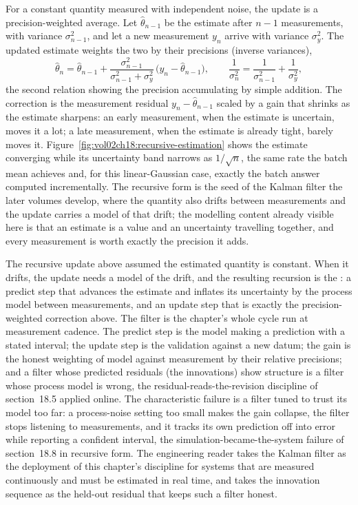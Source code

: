 For a constant quantity measured with independent noise, the update is a
precision-weighted average. Let $\hat\theta_{n-1}$ be the estimate after
$n-1$ measurements, with variance $\sigma_{n-1}^2$, and let a new
measurement $y_n$ arrive with variance $\sigma_y^2$. The updated estimate
weights the two by their precisions (inverse variances),
\[
\hat\theta_n = \hat\theta_{n-1} +
  \frac{\sigma_{n-1}^2}{\sigma_{n-1}^2 + \sigma_y^2}\,
  \bigl(y_n - \hat\theta_{n-1}\bigr),
\qquad
\frac{1}{\sigma_n^2} = \frac{1}{\sigma_{n-1}^2} + \frac{1}{\sigma_y^2},
\]
the second relation showing the precision accumulating by simple addition.
The correction is the measurement residual $y_n - \hat\theta_{n-1}$ scaled
by a gain that shrinks as the estimate sharpens: an early measurement, when
the estimate is uncertain, moves it a lot; a late measurement, when the
estimate is already tight, barely moves it.
Figure~\ref{fig:vol02ch18:recursive-estimation} shows the estimate
converging while its uncertainty band narrows as $1/\sqrt{n}$, the same rate
the batch mean achieves and, for this linear-Gaussian case, exactly the
batch answer computed incrementally. The recursive form is the seed of the
Kalman filter the later volumes develop, where the quantity also drifts
between measurements and the update carries a model of that drift; the
modelling content already visible here is that an estimate is a value and an
uncertainty travelling together, and every measurement is worth exactly the
precision it adds.



\begin{mastery}
The recursive update above assumed the estimated quantity is constant. When
it drifts, the update needs a model of the drift, and the resulting recursion
is the : a predict step that advances the estimate and
inflates its uncertainty by the process model between measurements, and an
update step that is exactly the precision-weighted correction above. The
filter is the chapter's whole cycle run at measurement cadence. The predict
step is the model making a prediction with a stated interval; the update step
is the validation against a new datum; the gain is the honest weighting of
model against measurement by their relative precisions; and a filter whose
predicted residuals (the innovations) show structure is a filter whose
process model is wrong, the residual-reads-the-revision discipline of
section~18.5 applied online. The characteristic failure is a filter tuned to
trust its model too far: a process-noise setting too small makes the gain
collapse, the filter stops listening to measurements, and it tracks its own
prediction off into error while reporting a confident interval, the
simulation-became-the-system failure of section~18.8 in recursive form. The
engineering reader takes the Kalman filter as the deployment of this
chapter's discipline for systems that are measured continuously and must be
estimated in real time, and takes the innovation sequence as the held-out
residual that keeps such a filter honest.
\end{mastery}

